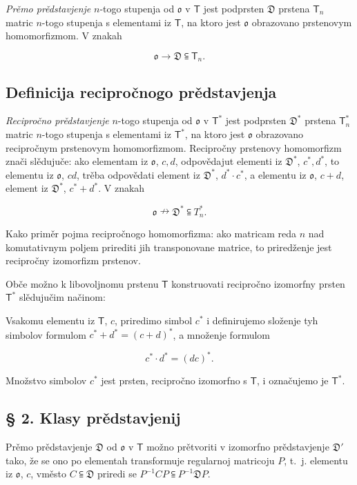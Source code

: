 \documentclass[11pt]{article}
\begin{document}
\emph{Prěmo prědstavjenje} \(n\)-togo stupenja od \(\mathfrak{o}\) v \(\mathsf T\) jest podprsten \(\mathfrak D\) prstena \(\mathsf T_n\) matric \(n\)-togo stupenja s elementami iz \(\mathsf T\), na ktoro jest \(\mathfrak{o}\) obrazovano prstenovym homomorfizmom. V znakah

\[
\mathfrak{o}\to\mathfrak D\subseteqq\mathsf T_n.
\]

\subsection*{Definicija recipročnogo prědstavjenja}\label{definition-der-reziproken-darstellung}

\emph{Recipročno prědstavjenje} \(n\)-togo stupenja od \(\mathfrak{o}\) v \(\mathsf T^*\) jest podprsten \(\mathfrak D^*\) prstena \(\mathsf T_n^*\) matric \(n\)-togo stupenja s elementami iz \(\mathsf T^*\), na ktoro jest \(\mathfrak{o}\) obrazovano recipročnym prstenovym homomorfizmom. Recipročny prstenovy homomorfizm znači slědujuče: ako elementam iz \(\mathfrak{o}\), \(c,d\), odpovědajut elementi iz \(\mathfrak D^*\), \(c^*,d^*\), to elementu iz \(\mathfrak{o}\), \(cd\), trěba odpovědati element iz \(\mathfrak D^*\), \(d^*\cdot c^*\), a elementu iz \(\mathfrak{o}\), \(c+d\), element iz \(\mathfrak D^*\), \(c^*+d^*\). V znakah

\[
\mathfrak{o}\nrightarrow\mathfrak D^*\subseteqq T_n^*.
\]

Kako priměr pojma recipročnogo homomorfizma: ako matricam reda \(n\) nad komutativnym poljem prirediti jih transponovane matrice, to priredženje jest recipročny izomorfizm prstenov.

Obče možno k libovoljnomu prstenu \(\mathsf T\) konstruovati recipročno izomorfny prsten \(\mathsf T^*\) slědujučim načinom:

Vsakomu elementu iz \(\mathsf T\), \(c\), priredimo simbol \(c^*\) i definirujemo složenje tyh simbolov formulom \(c^*+d^*=(c+d)^*\), a množenje formulom

\[
c^*\cdot d^*=(dc)^*.
\]

Množstvo simbolov \(c^*\) jest prsten, recipročno izomorfno s \(\mathsf T\), i označujemo je \(\mathsf T^*\).

\subsection*{§ 2. Klasy prědstavjenij}\label{darstellungsklassen}

Prěmo prědstavjenje \(\mathfrak D\) od \(\mathfrak{o}\) v \(\mathsf T\) možno prětvoriti v izomorfno prědstavjenje \(\mathfrak D'\) tako, že se ono po elementah transformuje regularnoj matricoju \(P\), t.~j. elementu iz \(\mathfrak{o}\), \(c\), vměsto \(C\subseteqq\mathfrak D\) priredi se \(P^{-1}CP\subseteqq P^{-1}\mathfrak D P\).
\end{document}
